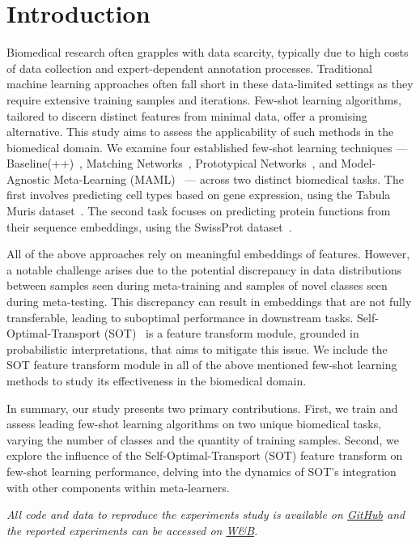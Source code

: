 \section{Introduction}

Biomedical research often grapples with data scarcity, typically due to high costs of data collection and expert-dependent annotation processes. Traditional machine learning approaches often fall short in these data-limited settings as they require extensive training samples and iterations. Few-shot learning algorithms, tailored to discern distinct features from minimal data, offer a promising alternative. This study aims to assess the applicability of such methods in the biomedical domain. We examine four established few-shot learning techniques — Baseline(++)~\cite{baseline}, Matching Networks~\cite{matchingnet}, Prototypical Networks~\cite{protonet}, and Model-Agnostic Meta-Learning (MAML)~\cite{maml} — across two distinct biomedical tasks. The first involves predicting cell types based on gene expression, using the Tabula Muris dataset~\cite{tabula2018}. The second task focuses on predicting protein functions from their sequence embeddings, using the SwissProt dataset~\cite{uniprot2019}.

All of the above approaches rely on meaningful embeddings of features. However, a notable challenge arises due to the potential discrepancy in data distributions between samples seen during meta-training and samples of novel classes seen during meta-testing. This discrepancy can result in embeddings that are not fully transferable, leading to suboptimal performance in downstream tasks. Self-Optimal-Transport (SOT)~\cite{sot} is a feature transform module, grounded in probabilistic interpretations, that aims to mitigate this issue. We include the SOT feature transform module in all of the above mentioned few-shot learning methods to study its effectiveness in the biomedical domain.

In summary, our study presents two primary contributions. First, we train and assess leading few-shot learning algorithms on two unique biomedical tasks, varying the number of classes and the quantity of training samples. Second, we explore the influence of the Self-Optimal-Transport (SOT) feature transform on few-shot learning performance, delving into the dynamics of SOT's integration with other components within meta-learners.

\textit{All code and data to reproduce the experiments study is available on \href{https://github.com/mikasenghaas/few-shot-benchmark}{GitHub} and the reported experiments can be accessed on \href{https://wandb.ai/metameta-learners/few-shot-benchmark}{W\&B}.}